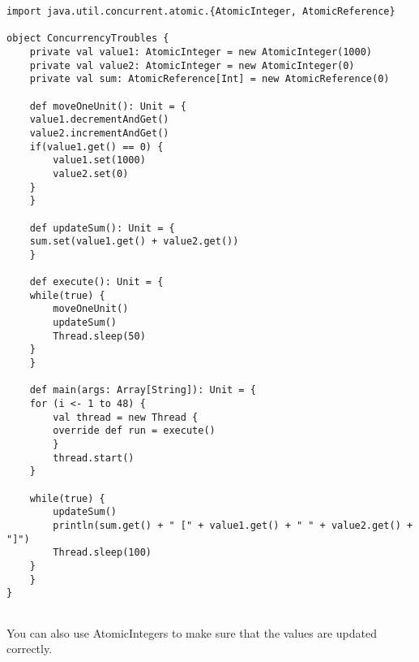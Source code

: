 \documentclass[11pt,a4paper]{report}
\begin{document}
\begin{lstlisting}
import java.util.concurrent.atomic.{AtomicInteger, AtomicReference}

object ConcurrencyTroubles {
    private val value1: AtomicInteger = new AtomicInteger(1000)
    private val value2: AtomicInteger = new AtomicInteger(0)
    private val sum: AtomicReference[Int] = new AtomicReference(0)

    def moveOneUnit(): Unit = {
    value1.decrementAndGet()
    value2.incrementAndGet()
    if(value1.get() == 0) {
        value1.set(1000)
        value2.set(0)
    }
    }

    def updateSum(): Unit = {
    sum.set(value1.get() + value2.get())
    }
    
    def execute(): Unit = {
    while(true) {
        moveOneUnit()
        updateSum()
        Thread.sleep(50)
    }
    }

    def main(args: Array[String]): Unit = {
    for (i <- 1 to 48) {
        val thread = new Thread {
        override def run = execute()
        }
        thread.start()
    }
    
    while(true) {
        updateSum()
        println(sum.get() + " [" + value1.get() + " " + value2.get() + "]")
        Thread.sleep(100)
    }
    }
}
     
\end{lstlisting}
You can also use AtomicIntegers to make sure that the values are updated correctly.
\end{document}
